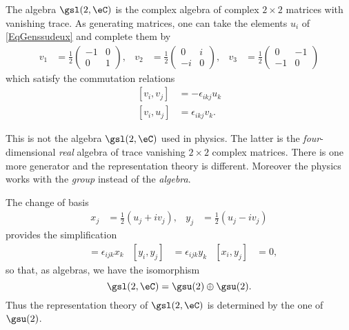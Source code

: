 The algebra $\gsl(2,\eC)$ is the complex algebra of complex $2\times 2$ matrices with vanishing trace. As generating matrices, one can take the elements $u_i$ of \eqref{EqGenssudeux} and complete them by
\begin{align*}
	v_1 & =\frac{ 1 }{2}
	\begin{pmatrix}
		-1 & 0 \\
		0  & 1
	\end{pmatrix},
	    & v_2            & =\frac{ 1 }{2}
	\begin{pmatrix}
		0  & i \\
		-i & 0
	\end{pmatrix},
	    & v_3            & =\frac{ 1 }{2}
	\begin{pmatrix}
		0  & -1 \\
		-1 & 0
	\end{pmatrix}
\end{align*}
which satisfy the commutation relations
\begin{subequations}
	\begin{align}
		[v_i,v_j] & =-\epsilon_{ikj}u_k \\
		[v_i,u_j] & =\epsilon_{ikj}v_k.
	\end{align}
\end{subequations}

\begin{remark}
	This is not the algebra \( \gsl(2,\eC)\) used in physics. The latter is the \emph{four}-dimensional \emph{real} algebra of trace vanishing \( 2\times 2\) complex matrices. There is one more generator and the representation theory is different. Moreover the physics works with the \emph{group} instead of the \emph{algebra}.
\end{remark}

The change of basis
\begin{align}
	x_j & =\frac{ 1 }{2}(u_j+iv_j), & y_j & =\frac{ 1 }{2}(u_j-iv_j)
\end{align}
provides the simplification
\begin{align}
	[x_i,x_j] & =\epsilon_{ijk}x_k & [y_i,y_j] & =\epsilon_{ijk}y_k & [x_i,y_j] & =0,
\end{align}
so that, as algebras, we have the isomorphism
\begin{equation}
	\gsl(2,\eC)=\gsu(2)\oplus\gsu(2).
\end{equation}
Thus the representation theory of $\gsl(2,\eC)$ is determined by the one of $\gsu(2)$.


